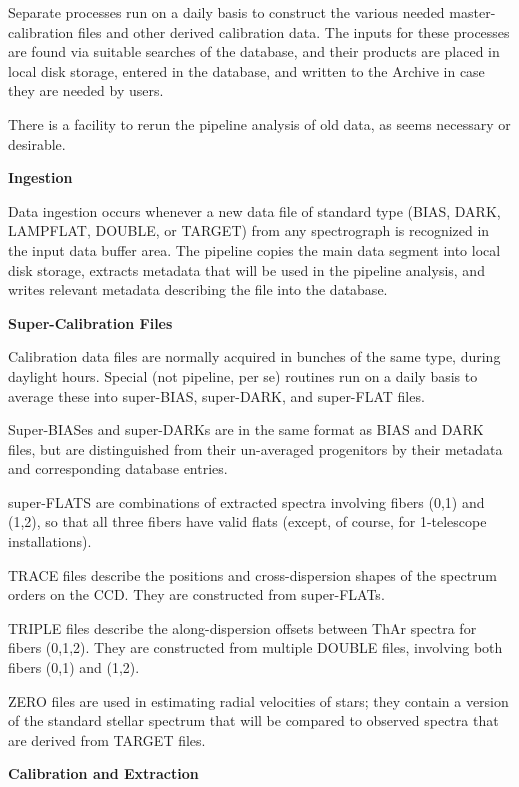 Separate processes run on a daily basis to construct the various needed
master-calibration files and other derived calibration data.  
The inputs for these processes are found via suitable searches of the database,
and their products are placed in local disk storage, entered in the database,
and written to the
Archive in case they are needed by users.

There is a facility to rerun the pipeline analysis of old data, as seems
necessary or desirable.

\vskip12pt
\parindent=0pt
{\bf{Ingestion}}
\vskip8pt
\parindent20pt

Data ingestion occurs whenever a new data file of standard type
(BIAS, DARK, LAMPFLAT, DOUBLE, or TARGET) from any spectrograph is 
recognized in the input data buffer area.  The pipeline copies the main data
segment into local disk storage, extracts metadata that will be used in
the pipeline analysis, and writes relevant metadata describing the file into
the database.

\vskip12pt
\parindent=0pt
{\bf{Super-Calibration Files}}
\vskip8pt
\parindent20pt

Calibration data files are normally acquired in bunches of the same type,
during daylight hours.
Special (not pipeline, per se) routines run on a daily basis to average these
into super-BIAS, super-DARK, and super-FLAT files.  

Super-BIASes and super-DARKs are in 
the same format as BIAS and DARK files, but are distinguished from their
un-averaged progenitors by their metadata and corresponding database entries.

super-FLATS are combinations of extracted spectra involving fibers (0,1) 
and (1,2), so that all three fibers have valid flats 
(except, of course, for 1-telescope installations).

TRACE files describe the positions and cross-dispersion shapes of the
spectrum orders on the CCD.
They are constructed from super-FLATs.

TRIPLE files describe the along-dispersion offsets between ThAr spectra
for fibers (0,1,2).
They are constructed from multiple DOUBLE files, involving both fibers (0,1)
and (1,2).

ZERO files are used in estimating radial velocities of stars; they contain
a version of the standard stellar spectrum that will be compared to observed
spectra that are derived from TARGET files.

\vskip12pt
\parindent=0pt
{\bf{Calibration and Extraction}}
\vskip8pt
\parindent20pt

